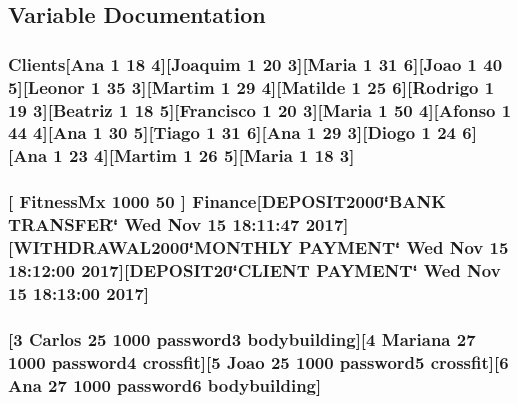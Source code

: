 \subsection{Variable Documentation}
\subsubsection[{\texorpdfstring{Clients}{Clients}}]{\setlength{\rightskip}{0pt plus 5cm}Clients\mbox{[}Ana 1 18 4\mbox{]}\mbox{[}Joaquim 1 20 3\mbox{]}\mbox{[}Maria 1 31 6\mbox{]}\mbox{[}Joao 1 40 5\mbox{]}\mbox{[}Leonor 1 35 3\mbox{]}\mbox{[}Martim 1 29 4\mbox{]}\mbox{[}Matilde 1 25 6\mbox{]}\mbox{[}Rodrigo 1 19 3\mbox{]}\mbox{[}Beatriz 1 18 5\mbox{]}\mbox{[}Francisco 1 20 3\mbox{]}\mbox{[}Maria 1 50 4\mbox{]}\mbox{[}Afonso 1 44 4\mbox{]}\mbox{[}Ana 1 30 5\mbox{]}\mbox{[}Tiago 1 31 6\mbox{]}\mbox{[}Ana 1 29 3\mbox{]}\mbox{[}Diogo 1 24 6\mbox{]}\mbox{[}Ana 1 23 4\mbox{]}\mbox{[}Martim 1 26 5\mbox{]}\mbox{[}Maria 1 18 3\mbox{]}}\hypertarget{File_8txt_ab53c6b8a41aeef0c40b64d3d2c428a6b}{}\label{File_8txt_ab53c6b8a41aeef0c40b64d3d2c428a6b}
\subsubsection[{\texorpdfstring{Finance}{Finance}}]{ \mbox{[} Fitness\+Mx 1000 50 \mbox{]} {\bf Finance}\mbox{[}D\+E\+P\+O\+S\+I\+T2000\char`\"{}B\+A\+NK T\+R\+A\+N\+S\+F\+ER\char`\"{} \textquotesingle{}Wed Nov 15 18\+:11\+:47 2017\textquotesingle{}\mbox{]}\mbox{[}W\+I\+T\+H\+D\+R\+A\+W\+A\+L2000\char`\"{}M\+O\+N\+T\+H\+LY P\+A\+Y\+M\+E\+NT\char`\"{} \textquotesingle{}Wed Nov 15 18\+:12\+:00 2017\textquotesingle{}\mbox{]}\mbox{[}D\+E\+P\+O\+S\+I\+T20\char`\"{}C\+L\+I\+E\+NT P\+A\+Y\+M\+E\+NT\char`\"{} \textquotesingle{}Wed Nov 15 18\+:13\+:00 2017\textquotesingle{}\mbox{]}}\hypertarget{File_8txt_a4d8a5d84ce8d74c2e12ef31b160e54b1}{}\label{File_8txt_a4d8a5d84ce8d74c2e12ef31b160e54b1}
\subsubsection[{\texorpdfstring{Personal\+Trainer}{PersonalTrainer}}]{\mbox{[}3 Carlos 25 1000 password3 bodybuilding\mbox{]}\mbox{[}4 Mariana 27 1000 password4 crossfit\mbox{]}\mbox{[}5 Joao 25 1000 password5 crossfit\mbox{]}\mbox{[}6 Ana 27 1000 password6 bodybuilding\mbox{]}}\hypertarget{File_8txt_a8aa9f45f51f1850059c6a3d9af92d5fd}{}\label{File_8txt_a8aa9f45f51f1850059c6a3d9af92d5fd}
